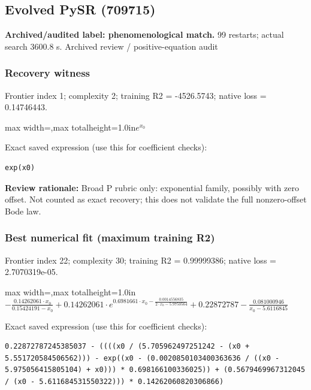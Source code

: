 \documentclass[10pt,letterpaper,landscape]{article}
\begin{document}
\begin{minipage}[t]{0.485\textwidth}
\subsection*{Evolved PySR (709715)}
\textbf{Archived/audited label: phenomenological match.} 99 restarts; actual search 3600.8 s.
{\small Archived review / positive-equation audit}
\subsubsection*{Recovery witness}
Frontier index 1; complexity 2; training R2 = -4526.5743; native loss = 0.14746443.
\begin{center}\begin{adjustbox}{max width=\linewidth,max totalheight=1.0in}$\displaystyle e^{x_{0}}$\end{adjustbox}\end{center}
{\scriptsize Exact saved expression (use this for coefficient checks):}
\begin{lstlisting}
exp(x0)
\end{lstlisting}
{\small\textbf{Review rationale:} Broad P rubric only: exponential family, possibly with zero offset. Not counted as exact recovery; this does not validate the full nonzero-offset Bode law.}
\subsubsection*{Best numerical fit (maximum training R2)}
Frontier index 22; complexity 30; training R2 = 0.99999386; native loss = 2.7070319e-05.
\begin{center}\begin{adjustbox}{max width=\linewidth,max totalheight=1.0in}$\displaystyle - \frac{0.14262061 \cdot x_{0}}{0.15424191 - x_{0}} + 0.14262061 \cdot e^{0.6981661 \cdot x_{0} - \frac{0.0014556835}{2 \cdot x_{0} - 5.9750564}} + 0.22872787 - \frac{0.081000946}{x_{0} - 5.6116845}$\end{adjustbox}\end{center}
{\scriptsize Exact saved expression (use this for coefficient checks):}
\begin{lstlisting}
0.22872787245385037 - ((((x0 / (5.705962497251242 - (x0 + 5.551720584506562))) - exp((x0 - (0.0020850103400363636 / ((x0 - 5.975056415805104) + x0))) * 0.698166100336025)) + (0.5679469967312045 / (x0 - 5.611684531550322))) * 0.14262060820306866)
\end{lstlisting}
\end{minipage}
\clearpage{}\label{bode-10004}
\end{document}

